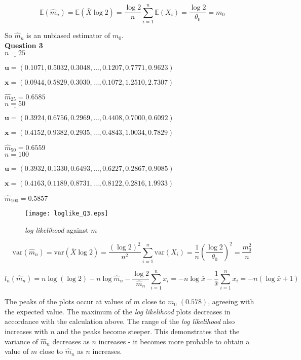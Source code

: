 \documentclass[12pt]{extarticle}
\begin{document}
$$\mathbb{E}(\widehat{m}_n) = \mathbb{E}(\bar{X}\log2) = \frac{\log2}{n}\sum_{i=1}^{n}\mathbb{E}(X_i) = \frac{\log{2}}{\theta_0} = m_0$$

So $\widehat{m}_n$ is an unbiased estimator of $m_0$.\\

\textbf{Question 3}\\

$\underline{n = 25}$

$\textbf{u} = (0.1071,0.5032,0.3048 ,\ldots ,0.1207,0.7771, 0.9623
)$

$\textbf{x} = (0.0944,0.5829,0.3030 ,\ldots, 0.1072,1.2510,2.7307)$

$\widehat{m}_{25} = 0.6585$\\


$\underline{n = 50}$

$\textbf{u} = (0.3924,0.6756, 0.2969, \ldots, 0.4408,0.7000,0.6092)$

$\textbf{x} = (0.4152,0.9382,0.2935, \ldots, 0.4843,  1.0034, 0.7829)$

$\widehat{m}_{50} = 0.6559$\\


$\underline{n = 100}$

$\textbf{u} = (0.3932,0.1330, 0.6493, \ldots, 0.6227, 0.2867, 0.9085)$

$\textbf{x} = (0.4163,0.1189,0.8731, \ldots, 0.8122,0.2816, 1.9933)$

$\widehat{m}_{100} = 0.5857$

\begin{figure}[htp!]
\centering
\texttt{[image: loglike\_Q3.eps]}
\caption{\textit{log likelihood} against $m$}
\label{figure:2}
\end{figure}

\pagebreak 

$$\mathrm{var}(\widehat{m}_n) = \mathrm{var}(\bar{X}\log2) = \frac{(\log2)^2}{n^2}\sum_{i=1}^{n}\mathrm{var}(X_i) = \frac{1}{n}\left(\frac{\log2}{\theta_0}\right)^2 = \frac{m_0^2}{n}$$

$$l_n(\widehat{m}_n) = n\log{\left(\log{2}\right)} -n\log{\widehat{m}_n} -\frac{\log{2}}{\widehat{m}_n}\sum_{i=1}^{n}x_i = -n\log\bar{x}-\frac{1}{\bar{x}}\sum_{i=1}^{n}x_i = -n(\log\bar{x}+1)$$

The peaks of the plots occur at values of $m$ close to $m_0$  $(0.578)$, agreeing with the expected value. The maximum of the \textit{log likelihood} plots decreases in accordance with the calculation above.  The range of the \textit{log likelihood} also increases with $n$ and the peaks become steeper. This demonstrates that the variance of $\widehat{m}_n$ decreases as $n$ increases - it becomes more probable to obtain a value of $m$ close to $\widehat{m}_n$ as $n$ increases.\\
\end{document}
